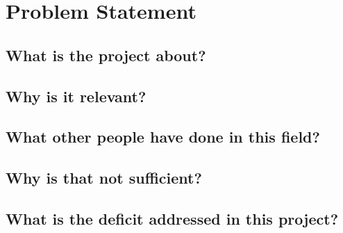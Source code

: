 \section{Problem Statement}
\subsection{What is the project about?}
\subsection{Why is it relevant?}
\subsection{What other people have done in this field?}
\subsection{Why is that not sufficient?}
\subsection{What is the deficit addressed in this project?}